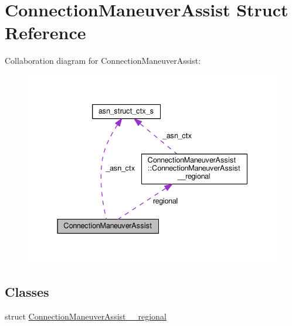 \hypertarget{structConnectionManeuverAssist}{}\section{Connection\+Maneuver\+Assist Struct Reference}
\label{structConnectionManeuverAssist}


Collaboration diagram for Connection\+Maneuver\+Assist\+:\nopagebreak
\begin{figure}[H]
\begin{center}
\leavevmode
\includegraphics[width=337pt]{structConnectionManeuverAssist__coll__graph}
\end{center}
\end{figure}
\subsection*{Classes}
\begin{DoxyCompactItemize}
\item 
struct \hyperlink{structConnectionManeuverAssist_1_1ConnectionManeuverAssist____regional}{Connection\+Maneuver\+Assist\+\_\+\+\_\+regional}
\end{DoxyCompactItemize}
